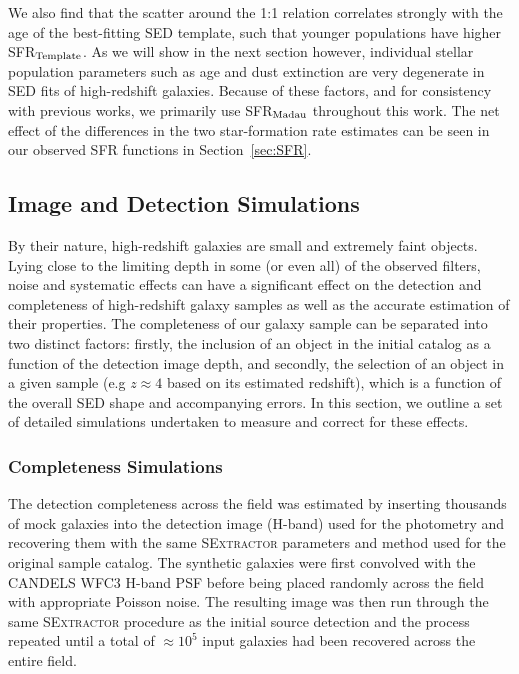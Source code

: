 We also find that the scatter around the 1:1 relation correlates strongly with the age of the best-fitting SED template, such that younger populations have higher SFR$_{\rm{Template}}$. As we will show in the next section however, individual stellar population parameters such as age and dust extinction are very degenerate in SED fits of high-redshift galaxies. Because of these factors, and for consistency with previous works, we primarily use SFR$_{\rm{Madau}}$ throughout this work. The net effect of the differences in the two star-formation rate estimates can be seen in our observed SFR functions in Section~\ref{sec:SFR}.

\subsection{Image and Detection Simulations}\label{sec:simulations}
By their nature, high-redshift galaxies are small and extremely faint objects. Lying close to the limiting depth in some (or even all) of the observed filters, noise and systematic effects can have a significant effect on the detection and completeness of high-redshift galaxy samples as well as the accurate estimation of their properties. The completeness of our galaxy sample can be separated into two distinct factors: firstly, the inclusion of an object in the initial catalog as a function of the detection image depth, and secondly, the selection of an object in a given sample (e.g $z\approx4$ based on its estimated redshift), which is a function of the overall SED shape and accompanying errors. In this section, we outline a set of detailed simulations undertaken to measure and correct for these effects.

\subsubsection{Completeness Simulations}\label{sec:completeness}
The detection completeness across the field was estimated by inserting thousands of mock galaxies into the detection image (H-band) used for the photometry and recovering them with the same \textsc{SExtractor} parameters and method used for the original sample catalog. The synthetic galaxies were first convolved with the CANDELS WFC3 H-band PSF before being placed randomly across the field with appropriate Poisson noise. The resulting image was then run through the same \textsc{SExtractor} procedure as the initial source detection and the process repeated until a total of $\approx  10^{5}$ input galaxies had been recovered across the entire field.

